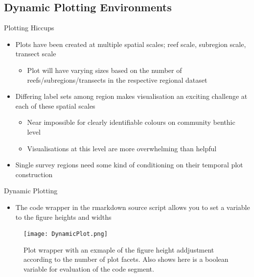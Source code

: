 \documentclass{beamer}
\begin{document}
          \subsection{Dynamic Plotting Environments}

              \begin{frame}{Plotting Hiccups}
                \begin{itemize}
                  \item Plots have been created at multiple spatial scales; reef scale, subregion scale, transect scale
                  \begin{itemize}
                    \item Plot will have varying sizes based on the number of reefs/subregions/transects in the respective regional dataset
                  \end{itemize}
                  \item Differing label sets among region makes visualisation an exciting challenge at each of these spatial scales
                  \begin{itemize}
                    \item Near impossible for clearly identifiable colours on community benthic level
                    \item Visualisations at this level are more overwhelming than helpful
                  \end{itemize}
                  \item Single survey regions need some kind of conditioning on their temporal plot construction
                \end{itemize}
              \end{frame}

              \begin{frame}{Dynamic Plotting}
                \begin{itemize}
                  \item The code wrapper in the rmarkdown source script allows you to set a variable to the figure heights and widths
                \end{itemize}

                \begin{figure}
                    \centering
                    \texttt{[image: DynamicPlot.png]}
                    \caption{Plot wrapper with an exmaple of the figure height addjustment according to the number of plot facets. Also shows here is a boolean variable for evaluation of the code segment. }
                \end{figure}
              \end{frame}
\end{document}
